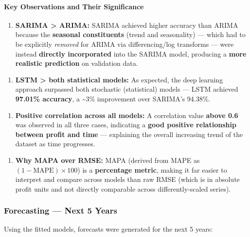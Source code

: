 \documentclass[12pt,openany]{book}
\begin{document}
\paragraph{Key Observations and Their Significance}

\begin{enumerate}[leftmargin=*]
    \item \textbf{SARIMA > ARIMA:} SARIMA achieved higher accuracy than ARIMA because the \textbf{seasonal constituents} (trend and seasonality) --- which had to be explicitly \textit{removed} for ARIMA via differencing/log transforms --- were instead \textbf{directly incorporated} into the SARIMA model, producing a \textbf{more realistic prediction} on validation data.
\end{enumerate}

\begin{enumerate}[leftmargin=*]
    \item \textbf{LSTM > both statistical models:} As expected, the deep learning approach surpassed both stochastic (statistical) models --- LSTM achieved \textbf{97.01\% accuracy}, a \textasciitilde{}3\% improvement over SARIMA's 94.38\%.
\end{enumerate}

\begin{enumerate}[leftmargin=*]
    \item \textbf{Positive correlation across all models:} A correlation value \textbf{above 0.6} was observed in all three cases, indicating a \textbf{good positive relationship between profit and time} --- explaining the overall increasing trend of the dataset as time progresses.
\end{enumerate}

\begin{enumerate}[leftmargin=*]
    \item \textbf{Why MAPA over RMSE:} MAPA (derived from MAPE as \((1-\text{MAPE}) \times 100\)) is a \textbf{percentage metric}, making it far easier to interpret and compare across models than raw RMSE (which is in absolute profit units and not directly comparable across differently-scaled series).
\end{enumerate}

\subsubsection{Forecasting --- Next 5 Years}

Using the fitted models, forecasts were generated for the next 5 years:
\end{document}

